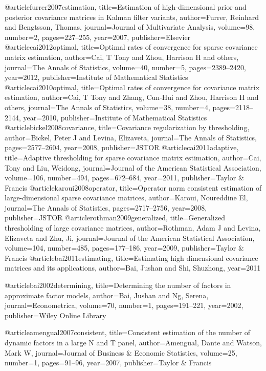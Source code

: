 @article{furrer2007estimation,
  title={Estimation of high-dimensional prior and posterior covariance matrices in Kalman filter variants},
  author={Furrer, Reinhard and Bengtsson, Thomas},
  journal={Journal of Multivariate Analysis},
  volume={98},
  number={2},
  pages={227--255},
  year={2007},
  publisher={Elsevier}
}
@article{cai2012optimal,
  title={Optimal rates of convergence for sparse covariance matrix estimation},
  author={Cai, T Tony and Zhou, Harrison H and others},
  journal={The Annals of Statistics},
  volume={40},
  number={5},
  pages={2389--2420},
  year={2012},
  publisher={Institute of Mathematical Statistics}
}
@article{cai2010optimal,
  title={Optimal rates of convergence for covariance matrix estimation},
  author={Cai, T Tony and Zhang, Cun-Hui and Zhou, Harrison H and others},
  journal={The Annals of Statistics},
  volume={38},
  number={4},
  pages={2118--2144},
  year={2010},
  publisher={Institute of Mathematical Statistics}
}
@article{bickel2008covariance,
  title={Covariance regularization by thresholding},
  author={Bickel, Peter J and Levina, Elizaveta},
  journal={The Annals of Statistics},
  pages={2577--2604},
  year={2008},
  publisher={JSTOR}
}
@article{cai2011adaptive,
  title={Adaptive thresholding for sparse covariance matrix estimation},
  author={Cai, Tony and Liu, Weidong},
  journal={Journal of the American Statistical Association},
  volume={106},
  number={494},
  pages={672--684},
  year={2011},
  publisher={Taylor \& Francis}
}
@article{karoui2008operator,
  title={Operator norm consistent estimation of large-dimensional sparse covariance matrices},
  author={Karoui, Noureddine El},
  journal={The Annals of Statistics},
  pages={2717--2756},
  year={2008},
  publisher={JSTOR}
}
@article{rothman2009generalized,
  title={Generalized thresholding of large covariance matrices},
  author={Rothman, Adam J and Levina, Elizaveta and Zhu, Ji},
  journal={Journal of the American Statistical Association},
  volume={104},
  number={485},
  pages={177--186},
  year={2009},
  publisher={Taylor \& Francis}
}
@article{bai2011estimating,
  title={Estimating high dimensional covariance matrices and its applications},
  author={Bai, Jushan and Shi, Shuzhong},
  year={2011}
}

@article{bai2002determining,
  title={Determining the number of factors in approximate factor models},
  author={Bai, Jushan and Ng, Serena},
  journal={Econometrica},
  volume={70},
  number={1},
  pages={191--221},
  year={2002},
  publisher={Wiley Online Library}
}

@article{amengual2007consistent,
  title={Consistent estimation of the number of dynamic factors in a large N and T panel},
  author={Amengual, Dante and Watson, Mark W},
  journal={Journal of Business \& Economic Statistics},
  volume={25},
  number={1},
  pages={91--96},
  year={2007},
  publisher={Taylor \& Francis}
}


